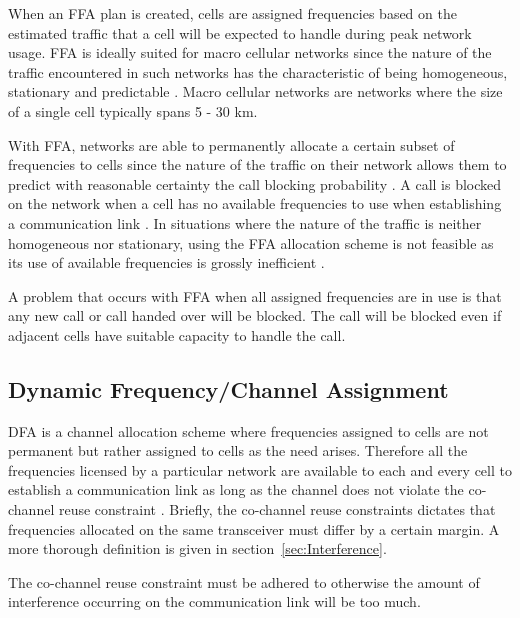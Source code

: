 When an \gls{FFA} plan is created, cells are assigned frequencies based on the estimated traffic that a cell will be expected to handle during peak network usage. \gls{FFA} is ideally suited for macro cellular networks since the nature of the traffic encountered in such networks has the characteristic of being homogeneous, stationary and predictable \cite{PrinciplesMobileCommunication}. Macro cellular networks are networks where the size of a single cell typically spans 5 - 30 km\cite{WirelessCommunications}.

With \gls{FFA}, networks are able to permanently allocate a certain subset of frequencies to cells since the nature of the traffic on their network allows them to predict with reasonable certainty the call blocking probability \cite{PrinciplesMobileCommunication}. A call is blocked on the network when a cell has no available frequencies to use when establishing a communication link \cite{PrinciplesMobileCommunication}.
In situations where the nature of the traffic is neither homogeneous nor stationary, using the \gls{FFA} allocation scheme is not feasible as its use of available frequencies is grossly inefficient \cite{PrinciplesMobileCommunication}.

A problem that occurs with \gls{FFA} when all assigned frequencies are in use is that any new call or call handed over will be blocked\cite{PrinciplesMobileCommunication}. The call will be blocked even if adjacent cells have suitable capacity to handle the call\cite{PrinciplesMobileCommunication}.

\subsection{Dynamic Frequency/Channel Assignment}
\gls{DFA} is a channel allocation scheme where frequencies assigned to cells are not permanent but rather assigned to cells as the need arises\cite{PrinciplesMobileCommunication}. Therefore all the frequencies licensed by a particular network are available to each and every cell to establish a communication link as long as the channel does not violate the co-channel reuse constraint \cite{PrinciplesMobileCommunication}. Briefly, the co-channel reuse constraints dictates that frequencies allocated on the same transceiver must differ by a certain margin. A more thorough definition is given in section~\ref{sec:Interference}.

The co-channel reuse constraint must be adhered to otherwise the amount of interference occurring on the communication link will be too much\cite{PrinciplesMobileCommunication}.

